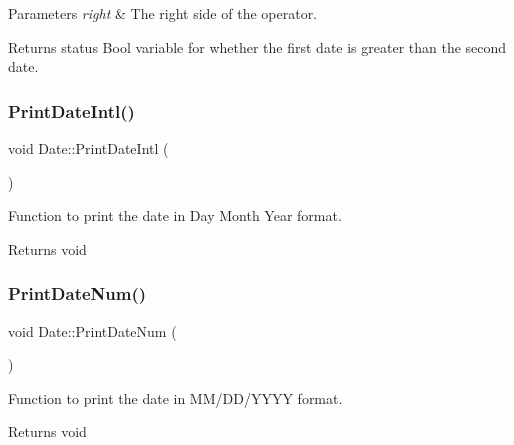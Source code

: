 \begin{DoxyParams}{Parameters}
{\em right} & The right side of the operator.\\
\hline
\end{DoxyParams}
\begin{DoxyReturn}{Returns}
status Bool variable for whether the first date is greater than the second date. 
\end{DoxyReturn}
\mbox{\label{class_date_afcaa5f92016d63644845ce1d934a339a}} 
\subsubsection{\texorpdfstring{PrintDateIntl()}{PrintDateIntl()}}
{\footnotesize\ttfamily void Date\+::\+Print\+Date\+Intl (\begin{DoxyParamCaption}{ }\end{DoxyParamCaption})\hspace{0.3cm}{\ttfamily [inline]}}



Function to print the date in Day Month Year format. 

\begin{DoxyReturn}{Returns}
void 
\end{DoxyReturn}
\mbox{\label{class_date_a885f573b35217aef6e4f35a8ac203c35}} 
\subsubsection{\texorpdfstring{PrintDateNum()}{PrintDateNum()}}
{\footnotesize\ttfamily void Date\+::\+Print\+Date\+Num (\begin{DoxyParamCaption}{ }\end{DoxyParamCaption})\hspace{0.3cm}{\ttfamily [inline]}}



Function to print the date in M\+M/\+D\+D/\+Y\+Y\+YY format. 

\begin{DoxyReturn}{Returns}
void 
\end{DoxyReturn}
\mbox{\label{class_date_a303bf76ec61948983685b333392a9559}} 
